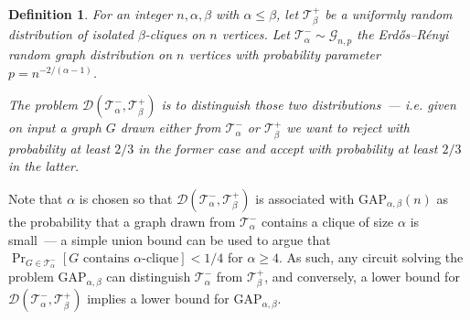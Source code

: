\documentclass[10pt,a4paper]{article}
\newcommand{\ErdosRenyi}{Erdős–Rényi }
\newtheorem{definition}[theorem]{Definition}
\newenvironment{comment}{}{}
\newcommand{\jnote}[1]{\todo[inline,backgroundcolor=blue!20!green]{#1 \\ \textsc{--Jarek}}}
\newcommand{\lnote}[1]{\todo[inline,backgroundcolor=blue!20!yellow]{#1 \\ \textsc{--Linus}}}
\begin{document}
\begin{definition}
    For an integer $n, \alpha, \beta$ with $\alpha \leq \beta$, let $\mathcal{T}^+_\beta$ be a uniformly random distribution of isolated $\beta$-cliques on $n$ vertices. Let $\mathcal{T}^-_{\alpha} \sim \mathcal{G}_{n, p}$ the \ErdosRenyi random graph distribution on $n$ vertices with probability parameter $p=n^{-2/(\alpha - 1)}$. 

    The problem $\mathcal{D}(\mathcal{T}^-_\alpha, \mathcal{T}^+_\beta)$ is to distinguish those two distributions~--- i.e. given on input a graph $G$ drawn either from $\mathcal{T}^-_{\alpha}$ or $\mathcal{T}^+_{\beta}$ we want to reject with probability at least $2/3$ in the former case and accept with probability at least $2/3$ in the latter.
\end{definition}
Note that $\alpha$ is chosen so that $\mathcal{D}(\mathcal{T}^-_\alpha, \mathcal{T}^+_\beta)$ is associated with $\mathrm{GAP}_{\alpha, \beta}(n)$ as the probability that a graph drawn from $\mathcal{T}^-_\alpha$ contains a clique of size $\alpha$ is small~--- a simple union bound can be used to argue that $\Pr_{G\in \mathcal{T}^-_\alpha}[G \text{ contains } \alpha \text{-clique}] < 1/4$ for $\alpha \geq 4$. As such, any circuit solving the problem $\mathrm{GAP}_{\alpha, \beta}$ can distinguish $\mathcal{T}^-_{\alpha}$ from $\mathcal{T}^+_{\beta}$, and conversely, a lower bound for $\mathcal{D}(\mathcal{T}^-_{\alpha}, \mathcal{T}^+_{\beta})$ implies a lower bound for $\mathrm{GAP}_{\alpha, \beta}$. 

\end{document}
